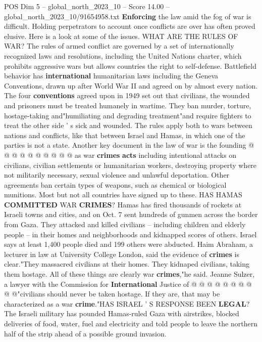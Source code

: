 \begin{textsample}{POS Dim 5 – global\_north\_2023\_10 – Score 14.00 – global\_north\_2023\_10/91654958.txt}  \label{ex:f5_pos_422}
\textbf{Enforcing} the law amid the fog of war is difficult.
Holding perpetrators to account once conflicts are over has often proved elusive.
Here is a look at some of the issues.
WHAT ARE THE RULES OF WAR?
The rules of armed conflict are governed by a set of internationally recognized laws and resolutions, including the United Nations charter, which prohibits aggressive wars but allows countries the right to self-defense.
Battlefield behavior has \textbf{international} humanitarian laws including the Geneva Conventions, drawn up after World War II and agreed on by almost every nation.
The four \textbf{conventions} agreed upon in 1949 set out that civilians, the wounded and prisoners must be treated humanely in wartime.
They ban murder, torture, hostage-taking and"humiliating and degrading treatment"and require fighters to treat the other side ' s sick and wounded.
The rules apply both to wars between nations and conflicts, like that between Israel and Hamas, in which one of the parties is not a state.
Another key document in the law of war is the founding @ @ @ @ @ @ @ @ @ @ as war \textbf{crimes} \textbf{acts} including intentional attacks on civilians, civilian settlements or humanitarian workers, destroying property where not militarily necessary, sexual violence and unlawful deportation.
Other agreements ban certain types of weapons, such as chemical or biological munitions.
Most but not all countries have signed up to these.
HAS HAMAS \textbf{COMMITTED} WAR \textbf{CRIMES}?
Hamas has fired thousands of rockets at Israeli towns and cities, and on Oct. 7 sent hundreds of gunmen across the border from Gaza.
They attacked and killed civilians -- including children and elderly people -- in their homes and neighborhoods and kidnapped scores of others.
Israel says at least 1,400 people died and 199 others were abducted.
Haim Abraham, a lecturer in law at University College London, said the evidence of \textbf{crimes} is clear."They massacred civilians at their homes.
They kidnaped civilians, taking them hostage.
All of these things are clearly war \textbf{crimes},"he said.
Jeanne Sulzer, a lawyer with the Commission for \textbf{International} Justice of @ @ @ @ @ @ @ @ @ @"civilians should never be taken hostage.
If they are, that may be characterized as a war \textbf{crime}."HAS ISRAEL ' S RESPONSE BEEN \textbf{LEGAL}?
The Israeli military has pounded Hamas-ruled Gaza with airstrikes, blocked deliveries of food, water, fuel and electricity and told people to leave the northern half of the strip ahead of a possible ground invasion.

\end{textsample}
